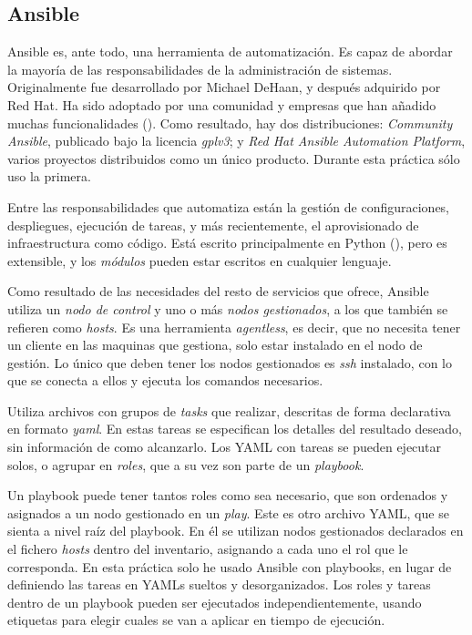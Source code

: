 \documentclass[11pt]{article}
\begin{document}
\begin{flushleft}
		
	
	
\clearpage
\section{Ansible}
Ansible es, ante todo, una herramienta de automatización. Es capaz de abordar la mayoría de las responsabilidades de la administración de sistemas. Originalmente fue desarrollado por Michael DeHaan, y después adquirido por Red Hat. Ha sido adoptado por una comunidad y empresas que han añadido muchas funcionalidades (\cite{ansible_collections}). Como resultado, hay dos distribuciones: \textit{Community Ansible}, publicado bajo la licencia \textit{\acrshort{gpl}v3}; y \textit{Red Hat Ansible Automation Platform}, varios proyectos distribuidos como un único producto. Durante esta práctica sólo uso la primera.
\linebreak

Entre las responsabilidades que automatiza están la gestión de configuraciones, despliegues, ejecución de tareas, y más recientemente, el aprovisionado de infraestructura como código. Está escrito principalmente en Python (\cite{ansible_git}), pero es extensible, y los \textit{módulos} pueden estar escritos en cualquier lenguaje.
\linebreak

Como resultado de las necesidades del resto de servicios que ofrece, Ansible utiliza un \textit{nodo de control} y uno o más \textit{nodos gestionados}, a los que también se refieren como \textit{hosts}. Es una herramienta \textit{agentless}, es decir, que no necesita tener un cliente en las maquinas que gestiona, solo estar instalado en el nodo de gestión. Lo único que deben tener los nodos gestionados es \textit{\acrshort{ssh}} instalado, con lo que se conecta a ellos y ejecuta los comandos necesarios.
\linebreak


    \begin{minipage}{.6\textwidth}
        Utiliza archivos con grupos de \textit{tasks} que realizar, descritas de forma declarativa en formato \textit{\acrshort{yaml}}. En estas tareas se especifican los detalles del resultado deseado, sin información de como alcanzarlo. Los YAML con tareas se pueden ejecutar solos, o agrupar en \textit{roles}, que a su vez son parte de un \textit{playbook}. 
        \linebreak

        Un playbook puede tener tantos roles como sea necesario, que son ordenados y asignados a un nodo gestionado en un \textit{play}. Este es otro archivo YAML, que se sienta a nivel raíz del playbook. En él se utilizan nodos gestionados declarados en el fichero \textit{hosts} dentro del inventario, asignando a cada uno el rol que le corresponda. En esta práctica solo he usado Ansible con playbooks, en lugar de definiendo las tareas en YAMLs sueltos y desorganizados. Los roles y tareas dentro de un playbook pueden ser ejecutados independientemente, usando etiquetas para elegir cuales se van a aplicar en tiempo de ejecución. 
  

\end{minipage}
\end{flushleft}
\end{document}
